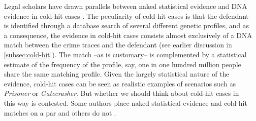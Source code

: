 \documentclass{article}
\begin{document}
Legal scholars have drawn parallels between naked statistical evidence and DNA evidence in cold-hit cases  \citep{ Roth2010}. 
The peculiarity of cold-hit cases  is that the defendant is identified through a database search of several different genetic profiles, and as a consequence, the evidence in cold-hit cases consists almost exclusively of a DNA match between the crime traces and the defendant (see earlier discussion in \ref{subsec:cold-hit}). The match --as is customary-- is complemented by a statistical estimate of the frequency of the profile, say, one in one hundred million people share the same matching profile. Given the largely statistical nature of the evidence, cold-hit cases can be seen as realistic examples of  scenarios such as \textit{Prisoner} or \textit{Gatecrasher}.
But whether we should think about cold-hit cases in this way is contested. 
Some authors place naked statistical evidence 
and cold-hit matches on a par \citep{Smith_conviction_mind_2017} and others do not \citep{Enoch2012Statistical,enoch2015sense}.
\end{document}
